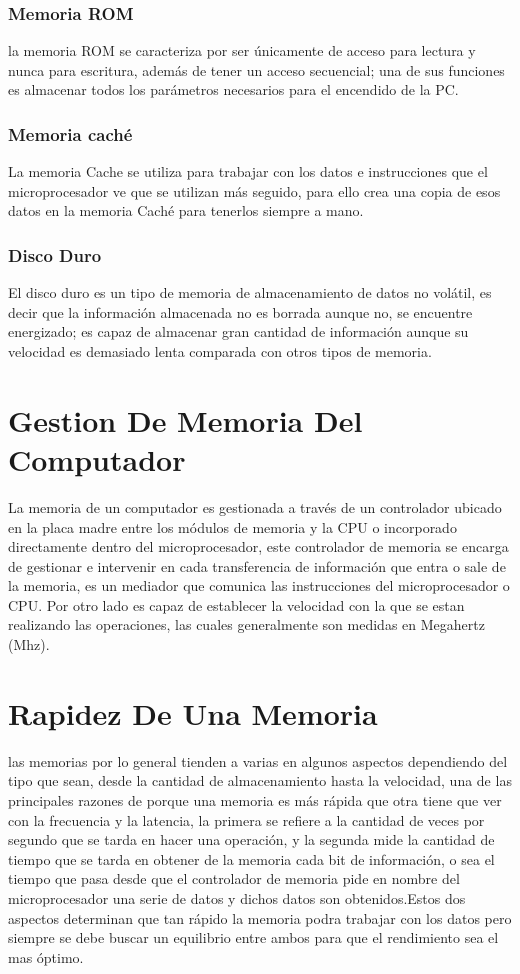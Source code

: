 \documentclass{article}
\begin{document}
\subsubsection{Memoria ROM}
la memoria ROM  se caracteriza por ser únicamente de acceso para lectura y nunca para escritura, además de tener un acceso secuencial; una de sus funciones es almacenar todos los parámetros necesarios para el encendido de la PC.\cite{romwebsite}

\subsubsection{Memoria caché}
La memoria Cache se utiliza para trabajar con los datos e instrucciones que el microprocesador ve que se utilizan más seguido, para ello crea una copia de esos datos en la memoria Caché para tenerlos siempre a mano.

\subsubsection{Disco Duro}
El disco duro es un tipo de memoria de almacenamiento de datos no volátil, es decir que la información almacenada no es borrada aunque no, se encuentre energizado; es capaz de almacenar gran cantidad de información aunque su velocidad es demasiado lenta comparada con otros tipos de memoria.\cite{discwebsite} 

\section{Gestion De Memoria Del Computador}

La memoria de un computador es gestionada a través de un controlador ubicado en la placa madre entre los módulos de memoria y la CPU o incorporado directamente dentro del microprocesador, este controlador de memoria se encarga de gestionar e intervenir en cada transferencia de información que entra o sale de la memoria, es un mediador que comunica las instrucciones del microprocesador o CPU. Por otro lado es capaz de establecer la velocidad con la que se estan realizando las operaciones, las cuales generalmente son medidas en Megahertz (Mhz).\cite{augus}
\section{Rapidez De Una Memoria}
las memorias por lo general tienden a varias en algunos aspectos dependiendo del tipo que sean, desde la cantidad de almacenamiento hasta la velocidad, una de las principales razones de porque una memoria es más rápida que otra tiene que ver con la frecuencia y la latencia, la primera se refiere a la cantidad de veces por segundo que se tarda en hacer una operación,  y la segunda  mide la cantidad de tiempo que se tarda en obtener de la memoria cada bit de información, o sea el tiempo que pasa desde que el controlador de memoria pide en nombre del microprocesador una serie de datos y dichos datos son obtenidos.Estos dos aspectos determinan que tan rápido la memoria podra trabajar con los datos pero  siempre se debe buscar un equilibrio entre ambos para que el rendimiento sea el mas óptimo. \cite{augus}
\end{document}
